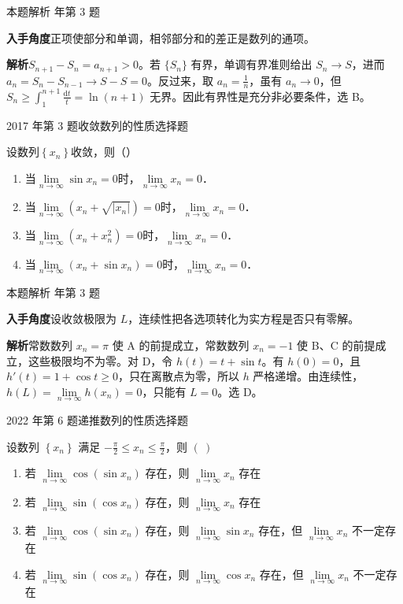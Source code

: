 \documentclass[UTF8,zihao=-4,fontset=fandol]{ctexart}
\renewcommand{\lim}{\operatorname*{lim}\limits}
\newcommand{\pickout}{\hfill（\hspace{1.4em}）}
\newenvironment{abcd}{\begin{enumerate}[label=\textup{(\Alph*)},leftmargin=2.3em,itemsep=1pt,topsep=4pt,parsep=1pt]}{\end{enumerate}}
\newcommand{\choices}[4]{%
  \begin{abcd}
    \item #1
    \item #2
    \item #3
    \item #4
  \end{abcd}}
\newcommand{\QuestionPage}[6]{%
  \par\noindent\begin{minipage}{\linewidth}
  \raggedright
  {\small\textcolor{black!60}{#3\quad #5}\hfill\textcolor{accent}{#2}}\par\smallskip}
\newcommand{\QuestionEnd}{\end{minipage}\par\medskip}
\newcommand{\QuestionPage}[6]{%
  \clearpage
  {\small\textcolor{accent}{#1\hfill #2}}\par\medskip
  {\small\textcolor{black!60}{#3\quad #5\hfill #6}}\par\vspace{9bp}}
\newcommand{\QuestionEnd}{}
\newenvironment{QuestionSolution}[1]{%
  \clearpage
  {\small\textcolor{black!60}{本题解析\quad #1}}\par\medskip
}{\par\clearpage}
\begin{document}
\begin{QuestionSolution}{2012 年第 3 题}
\textbf{入手角度}\quad 正项使部分和单调，相邻部分和的差正是数列的通项。

\textbf{解析}\quad \(S_{n+1}-S_n=a_{n+1}>0\)。若 \(\{S_n\}\) 有界，单调有界准则给出 \(S_n\to S\)，进而 \(a_n=S_n-S_{n-1}\to S-S=0\)。反过来，取 \(a_n=\frac{1}{n}\)，虽有 \(a_n\to0\)，但 \(S_n\ge\int_1^{n+1}\frac{\mathrm{d}t}{t}=\ln(n+1)\) 无界。因此有界性是充分非必要条件，选 B。
\end{QuestionSolution}

\QuestionPage{1.2 数列的极限}{选择题}{2017 年第 3 题}{1}{收敛数列的性质}{003 / 234}
设数列$\left\{x_n \right\}$收敛，则\pickout{}
\begin{abcd}
\item 当$\lim_{n \to \infty} \sin x_n = 0$时，$\lim_{n \to \infty} x_n = 0$．
\item 当$\lim_{n \to \infty} (x_n + \sqrt{\left| x_n \right|}) = 0$时，$\lim_{n \to \infty} x_n = 0$．
\item 当$\lim_{n \to \infty} (x_n + x_n^2) = 0$时，$\lim_{n \to \infty} x_n = 0$．
\item 当$\lim_{n \to \infty} (x_n + \sin x_n) = 0$时，$\lim_{n \to \infty} x_n = 0$．
\end{abcd}
\QuestionEnd

\begin{QuestionSolution}{2017 年第 3 题}
\textbf{入手角度}\quad 设收敛极限为 \(L\)，连续性把各选项转化为实方程是否只有零解。

\textbf{解析}\quad 常数数列 \(x_n=\pi\) 使 A 的前提成立，常数数列 \(x_n=-1\) 使 B、C 的前提成立，这些极限均不为零。对 D，令 \(h(t)=t+\sin t\)。有 \(h(0)=0\)，且 \(h'(t)=1+\cos t\ge0\)，只在离散点为零，所以 \(h\) 严格递增。由连续性，\(h(L)=\lim_{n\to\infty}h(x_n)=0\)，只能有 \(L=0\)。选 D。
\end{QuestionSolution}

\QuestionPage{1.2 数列的极限}{选择题}{2022 年第 6 题}{1}{递推数列的性质}{004 / 234}
设数列 \(\left\{ x_{n} \right\}\) 满足 \(- \frac{\pi}{2} \le x_{n} \le \frac{\pi}{2}\)，则 \(\left( \ \right)\)
\choices{若 \(\lim_{n \to \infty} \cos\left( \sin x_{n} \right)\) 存在，则 \(\lim_{n \to \infty} x_{n}\) 存在}{若 \(\lim_{n \to \infty} \sin\left( \cos x_{n} \right)\) 存在，则 \(\lim_{n \to \infty} x_{n}\) 存在}{若 \(\lim_{n \to \infty} \cos\left( \sin x_{n} \right)\) 存在，则 \(\lim_{n \to \infty} \sin x_{n}\) 存在，但 \(\lim_{n \to \infty} x_{n}\) 不一定存在}{若 \(\lim_{n \to \infty} \sin\left( \cos x_{n} \right)\) 存在，则 \(\lim_{n \to \infty} \cos x_{n}\) 存在，但 \(\lim_{n \to \infty} x_{n}\) 不一定存在}
\QuestionEnd
\end{document}
